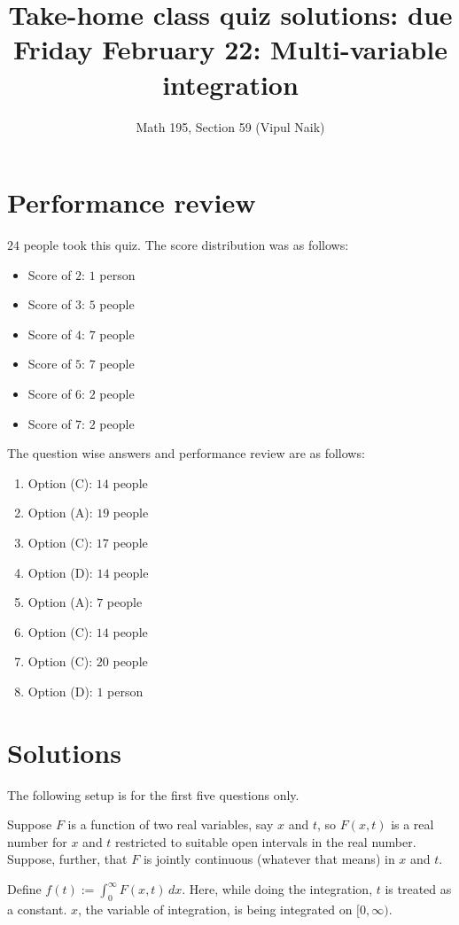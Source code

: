 \documentclass[10pt]{amsart}
\title{Take-home class quiz solutions: due Friday February 22: Multi-variable integration}
\author{Math 195, Section 59 (Vipul Naik)}
\begin{document}
\maketitle

\section{Performance review}

$24$ people took this quiz. The score distribution was as follows:

\begin{itemize}
\item Score of $2$: $1$ person
\item Score of $3$: $5$ people
\item Score of $4$: $7$ people
\item Score of $5$: $7$ people
\item Score of $6$: $2$ people
\item Score of $7$: $2$ people
\end{itemize}

The question wise answers and performance review are as follows:

\begin{enumerate}
\item Option (C): $14$ people
\item Option (A): $19$ people
\item Option (C): $17$ people
\item Option (D): $14$ people
\item Option (A): $7$ people
\item Option (C): $14$ people
\item Option (C): $20$ people
\item Option (D): $1$ person
\end{enumerate}

\section{Solutions}

The following setup is for the first five questions only.

Suppose $F$ is a function of two real variables, say $x$
and $t$, so $F(x,t)$ is a real number for $x$ and $t$ restricted to
suitable open intervals in the real number. Suppose, further, that $F$
is jointly continuous (whatever that means) in $x$ and $t$.

Define $f(t) := \int_0^\infty F(x,t) \, dx$. Here, while doing the
integration, $t$ is treated as a constant. $x$, the variable of
integration, is being integrated on $[0,\infty)$.
  
\end{document}
